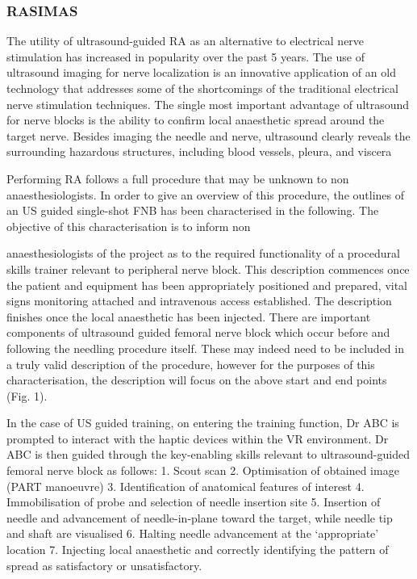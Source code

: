 \subsubsection{RASIMAS}
\label{art:rasimas}


The utility of ultrasound-guided RA as an alternative to electrical nerve stimulation has
increased in popularity over the past 5 years. The use of ultrasound imaging for nerve
localization is an innovative application of an old technology that addresses some of the
shortcomings of the traditional electrical nerve stimulation techniques. The single most
important advantage of ultrasound for nerve blocks is the ability to confirm local anaesthetic
spread around the target nerve. Besides imaging the needle and nerve, ultrasound clearly
reveals the surrounding hazardous structures, including blood vessels, pleura, and viscera

Performing RA follows a full procedure that may be unknown to non anaesthesiologists. In
order to give an overview of this procedure, the outlines of an US guided single-shot FNB
has been characterised in the following. The objective of this characterisation is to inform non 

anaesthesiologists of the project as to the required functionality of a procedural skills trainer
relevant to peripheral nerve block. This description commences once the patient and
equipment has been appropriately positioned and prepared, vital signs monitoring attached
and intravenous access established. The description finishes once the local anaesthetic has
been injected. There are important components of ultrasound guided femoral nerve block
which occur before and following the needling procedure itself. These may indeed need to be
included in a truly valid description of the procedure, however for the purposes of this
characterisation, the description will focus on the above start and end points (Fig. 1).


In the case of US guided training, on entering the training function, Dr ABC is prompted to
interact with the haptic devices within the VR environment. Dr ABC is then guided through
the key-enabling skills relevant to ultrasound-guided femoral nerve block as follows:
1. Scout scan
2. Optimisation of obtained image (PART manoeuvre)
3. Identification of anatomical features of interest
4. Immobilisation of probe and selection of needle insertion site
5. Insertion of needle and advancement of needle-in-plane toward the target, while needle
tip and shaft are visualised
6. Halting needle advancement at the ‘appropriate’ location
7. Injecting local anaesthetic and correctly identifying the pattern of spread as satisfactory or
unsatisfactory.

